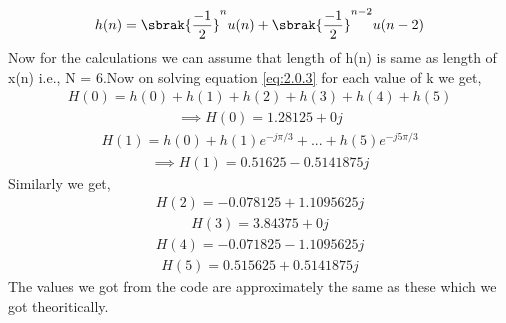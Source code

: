 \documentclass[journal,12pt,twocolumn]{IEEEtran}
\begin{document}
\begin{align}
    h(n)=\sbrak{\frac{-1}{2}}^nu(n) + \sbrak{\frac{-1}{2}}^{n-2}u(n-2)
\end{align}
Now for the calculations we can assume that length of h(n) is same as length of x(n) i.e., N = 6.Now on solving equation \eqref{eq:2.0.3} for each value of k we get,
\begin{align}
    H(0) = h(0) + h(1) + h(2) + h(3) + h(4) + h(5)
\end{align}
\begin{align}
    \implies H(0) = 1.28125 + 0j
\end{align}
\begin{align}
    H(1) = h(0) + h(1)e^{-j\pi /3} + ... + h(5)e^{-j5\pi /3}
\end{align}
\begin{align}
    \implies H(1) = 0.51625 - 0.5141875j
\end{align}
Similarly we get,
\begin{align}
    H(2) = -0.078125 + 1.1095625j
\end{align}
\begin{align}
    H(3) = 3.84375 + 0j
\end{align}
\begin{align}
    H(4) = -0.071825 - 1.1095625j
\end{align}
\begin{align}
    H(5) = 0.515625 + 0.5141875j
\end{align}
The values we got from the code are approximately the same as these which we got theoritically.
\end{document}
